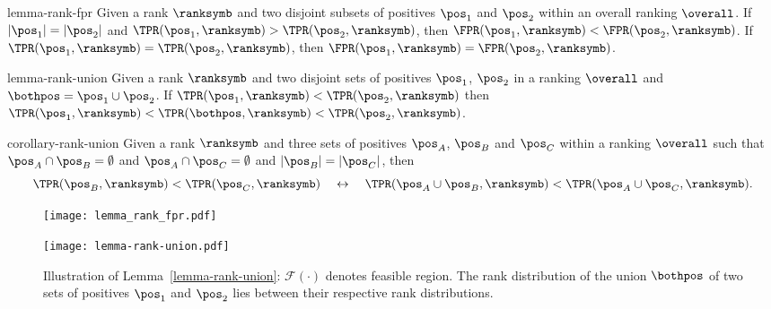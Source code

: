 \begin{replemma}{lemma-rank-fpr}
Given a rank $\ranksymb$ and two disjoint subsets of positives $\pos_1$ and $\pos_2$ within an overall ranking $\overall$. If $|\pos_1|=|\pos_2|$ and $\TPR(\pos_1, \ranksymb) > \TPR(\pos_2,\ranksymb)$, then $\FPR(\pos_1,\ranksymb) < \FPR(\pos_2,\ranksymb)$. If $\TPR(\pos_1, \ranksymb) = \TPR(\pos_2,\ranksymb)$, then $\FPR(\pos_1, \ranksymb) = \FPR(\pos_2,\ranksymb)$.
\end{replemma}



\begin{replemma}{lemma-rank-union}
Given a rank $\ranksymb$ and two disjoint sets of positives $\pos_1$, $\pos_2$ in a ranking $\overall$ and $\bothpos=\pos_1\cup\pos_2$. If $\TPR(\pos_1,\ranksymb) < \TPR(\pos_2, \ranksymb)$ then $\TPR(\pos_1,\ranksymb) < \TPR(\bothpos,\ranksymb) < \TPR(\pos_2, \ranksymb)$.
\end{replemma}

\begin{repcorollary}{corollary-rank-union}
Given a rank $\ranksymb$ and three sets of positives $\pos_A$, $\pos_B$ and $\pos_C$ within a ranking $\overall$ such that $\pos_A\cap\pos_B=\emptyset$ and $\pos_A\cap\pos_C=\emptyset$ and $|\pos_B|=|\pos_C|$, then
\begin{equation*}
\TPR(\pos_B,\ranksymb) < \TPR(\pos_C,\ranksymb) \quad\leftrightarrow\quad \TPR(\pos_A\cup \pos_B,\ranksymb) < \TPR(\pos_A\cup\pos_C,\ranksymb).
\end{equation*}
\end{repcorollary}

\ifx
\begin{figure}[!h]
  \centering
  \RawFloats
  \begin{minipage}[b]{0.49\textwidth}
  \texttt{[image: lemma\_rank\_fpr.pdf]}
  \caption{Illustration of Lemma~\ref{lemma-rank-fpr}: higher TPR at a given rank $r$ implies lower FPR at $r$ for two positive sets of the same size.}
  \label{fig:lemma-rank-fpr}
  \vfill
  \end{minipage}
  \hfill
  \begin{minipage}[b]{0.49\textwidth}
  \texttt{[image: lemma-rank-union.pdf]}
  \caption{Illustration of Lemma~\ref{lemma-rank-union}: $\mathcal{F}(\cdot)$ denotes feasible region. The rank distribution of the union $\bothpos$ of two sets of positives $\pos_1$ and $\pos_2$ lies between their respective rank distributions.} 
  \label{fig:lemma-rank-union}
\vfill
  \end{minipage}
\end{figure}
\fi


